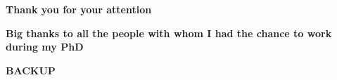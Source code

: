 {
\begin{frame}
\begin{center}
       \Huge\textbf{Thank you for your attention}
\end{center}
\vspace{2em}
\begin{center}
       \Large\textbf{Big thanks to all the people with whom I had the chance to work during my PhD}
\end{center}
\end{frame}
}

\begin{frame}
\begin{center}
       \Huge\textbf{BACKUP}
    \end{center}
\end{frame}

